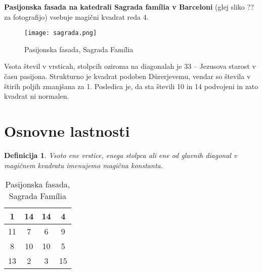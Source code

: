 \documentclass[a4paper,12pt]{article}
\newtheorem{definition}{Definicija}
\newcommand{\pojem}[1]{\emph{#1}}
\begin{document}
\textbf{Pasijonska fasada na katedrali Sagrada família v Barceloni}
(glej sliko ?? za fotografijo) vsebuje magični kvadrat reda 4.
\begin{figure}[!ht]
   \centering
   \caption{Pasijonska fasada, Sagrada Família}
   \label{fig:sagrada}
   \texttt{[image: sagrada.png]}
\end{figure}


Vsota števil v vrsticah, stolpcih oziroma na diagonalah je 33 -- Jezusova starost
v času pasijona. Strukturno je kvadrat podoben Dürerjevemu, vendar so števila
v štirih poljih zmanjšana za 1. Posledica je, da sta števili 10 in 14 podvojeni
in zato kvadrat ni normalen.



\section{Osnovne lastnosti}

\begin{definition}
      Vsoto ene vrstice, enega stolpca ali ene od glavnih diagonal
      v magičnem kvadratu imenujemo \pojem{magična konstanta}.
\end{definition}      

\begin{table}[h]
   \centering
   \caption{Pasijonska fasada, Sagrada Família}
   \label{table:sagrada}
   \begin{tabular}{|c|c|c|c|}
      \hline
      1 & 14 & 14 &  4 \\
      \hline
      11 &  7 &  6 &  9 \\
      \hline
      8 & 10 & 10 &  5 \\
      \hline
      13 &  2 &  3 & 15 \\
      \hline
      
   \end{tabular}
   
\end{table}
\end{document}
